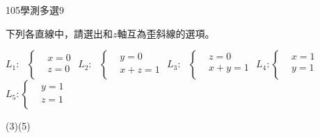     \begin{QUESTION}
        \begin{ExamInfo}{105}{學測}{多選}{9}
        \end{ExamInfo}
        \begin{ExamAnsRateInfo}{46}{77}{40}{21}
        \end{ExamAnsRateInfo}
        \begin{QBODY}
            下列各直線中，請選出和$z$軸互為歪斜線的選項。
			\begin{QOPS}
				\QOP ${{L}_{1}}:\text{ }\left\{ \begin{aligned}
				  & x=0 \\ 
				 & z=0 \\ 
				\end{aligned} \right.$	
                \QOP ${{L}_{\text{2}}}:\text{ }\left\{ \begin{aligned}
				  & y=0 \\ 
				 & x+z=1 \\ 
				\end{aligned} \right.$	
                \QOP ${{L}_{3}}:\text{ }\left\{ \begin{aligned}
				  & z=0 \\ 
				 & x+y=1 \\ 
				\end{aligned} \right.$
				\QOP ${{L}_{4}}:\left\{ \begin{aligned}
				  & x=1 \\ 
				 & y=1 \\ 
				\end{aligned} \right.$	
                \QOP ${{L}_{5}}:\left\{ \begin{aligned}
				  & y=1 \\ 
				 & z=1 \\ 
				\end{aligned} \right. $
			\end{QOPS}
        \end{QBODY}
        \begin{QFROMS}
        \end{QFROMS}
        \begin{QTAGS}\end{QTAGS}
        \begin{QANS}
            (3)(5)
        \end{QANS}
        \begin{QSOLLIST}
        \end{QSOLLIST}
        \begin{QEMPTYSPACE}
        \end{QEMPTYSPACE}
    \end{QUESTION}
